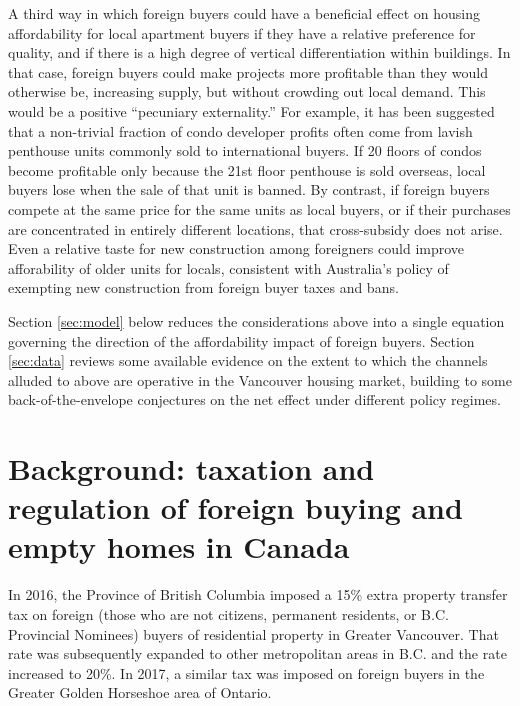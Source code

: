 \documentclass[12pt]{article}
\begin{document}
A third way in which foreign buyers could have a beneficial effect on housing
affordability for local apartment buyers if they have a relative preference for
quality, and if there is a high degree of vertical differentiation within
buildings. In that case, foreign buyers could make projects more profitable
than they would otherwise be, increasing supply, but without crowding out local
demand. This would be a positive ``pecuniary externality.'' For example, it has
been suggested that a non-trivial fraction of condo developer profits often
come from lavish penthouse units commonly sold to international buyers. If 20
floors of condos become profitable only because the 21st floor penthouse is
sold overseas, local buyers lose when the sale of that unit is banned. By
contrast, if foreign buyers compete at the same price for the same units as
local buyers, or if their purchases are concentrated in entirely different
locations, that cross-subsidy does not arise. Even a relative taste for new
construction among foreigners could improve afforability of older units for
locals, consistent with Australia's policy of exempting new construction from
foreign buyer taxes and bans.

Section \ref{sec:model} below reduces the considerations above into a single
equation governing the direction of the affordability impact of foreign buyers.
Section \ref{sec:data} reviews some available evidence on the extent to which
the channels alluded to above are operative in the Vancouver housing market,
building to some back-of-the-envelope conjectures on the net effect under
different policy regimes.

\section{\label{sec:taxes} Background: taxation and regulation of foreign buying and empty homes in Canada}

In 2016, the Province of British Columbia imposed a 15\% extra property
transfer tax on foreign (those who are not citizens, permanent residents, or
B.C. Provincial Nominees) buyers of residential property in Greater Vancouver.
That rate was subsequently expanded to other metropolitan areas in B.C. and the
rate increased to 20\%. In 2017, a similar tax was imposed on foreign buyers in
the Greater Golden Horseshoe area of Ontario.
\end{document}
